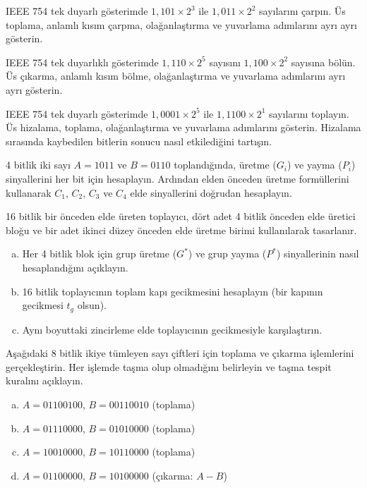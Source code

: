 \begin{alistirma}[\orta]
IEEE 754 tek duyarlı gösterimde $1{,}101 \times 2^3$ ile $1{,}011 \times 2^2$ sayılarını çarpın. Üs toplama, anlamlı kısım çarpma, olağanlaştırma ve yuvarlama adımlarını ayrı ayrı gösterin.
\end{alistirma}

\begin{alistirma}[\orta]
IEEE 754 tek duyarlıklı gösterimde $1{,}110 \times 2^{5}$ sayısını $1{,}100 \times 2^{2}$ sayısına bölün. Üs çıkarma, anlamlı kısım bölme, olağanlaştırma ve yuvarlama adımlarını ayrı ayrı gösterin.
\end{alistirma}

\begin{alistirma}[\orta]
IEEE 754 tek duyarlı gösterimde $1{,}0001 \times 2^5$ ile $1{,}1100 \times 2^1$ sayılarını toplayın. Üs hizalama, toplama, olağanlaştırma ve yuvarlama adımlarını gösterin. Hizalama sırasında kaybedilen bitlerin sonucu nasıl etkilediğini tartışın.
\end{alistirma}

\begin{alistirma}[\orta]
4 bitlik iki sayı $A = 1011$ ve $B = 0110$ toplandığında, üretme ($G_i$) ve yayma ($P_i$) sinyallerini her bit için hesaplayın. Ardından elden önceden üretme formüllerini kullanarak $C_1$, $C_2$, $C_3$ ve $C_4$ elde sinyallerini doğrudan hesaplayın.
\end{alistirma}

\begin{alistirma}[\zor]
16 bitlik bir önceden elde üreten toplayıcı, dört adet 4 bitlik önceden elde üretici bloğu ve bir adet ikinci düzey önceden elde üretme birimi kullanılarak tasarlanır.
\begin{enumerate}[(a)]
\item Her 4 bitlik blok için grup üretme ($G^*$) ve grup yayma ($P^*$) sinyallerinin nasıl hesaplandığını açıklayın.
\item 16 bitlik toplayıcının toplam kapı gecikmesini hesaplayın (bir kapının gecikmesi $t_g$ olsun).
\item Aynı boyuttaki zincirleme elde toplayıcının gecikmesiyle karşılaştırın.
\end{enumerate}
\end{alistirma}

\begin{alistirma}[\orta]
Aşağıdaki 8 bitlik ikiye tümleyen sayı çiftleri için toplama ve çıkarma işlemlerini gerçekleştirin. Her işlemde taşma olup olmadığını belirleyin ve taşma tespit kuralını açıklayın.
\begin{enumerate}[(a)]
\item $A = 01100100$, $B = 00110010$ (toplama)
\item $A = 01110000$, $B = 01010000$ (toplama)
\item $A = 10010000$, $B = 10110000$ (toplama)
\item $A = 01100000$, $B = 10100000$ (çıkarma: $A - B$)
\end{enumerate}
\end{alistirma}

